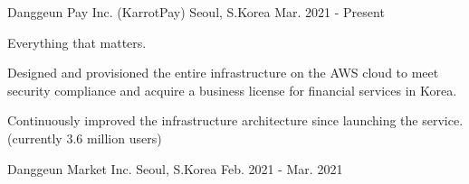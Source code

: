 

\begin{cventries}

	{Danggeun Pay Inc. (KarrotPay)} %
	{Seoul, S.Korea} %
	{Mar. 2021 - Present} %
	{
		\begin{cvitems} %
			\item {Everything that matters.}
			\item {Designed and provisioned the entire infrastructure on the AWS cloud to meet security compliance and acquire a business license for financial services in Korea.}
			\item {Continuously improved the infrastructure architecture since launching the service. (currently 3.6 million users)}
		\end{cvitems}
	}

	{Danggeun Market Inc.} %
	{Seoul, S.Korea} %
	{Feb. 2021 - Mar. 2021} %
	{
	}


\end{cventries}
